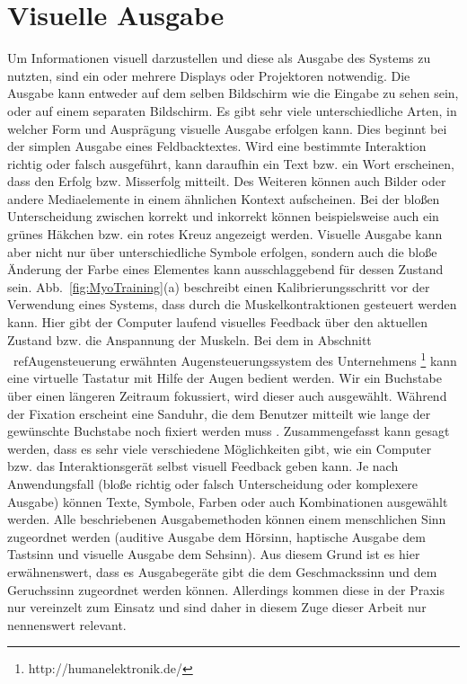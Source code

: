 \section{Visuelle Ausgabe}
Um Informationen visuell darzustellen und diese als Ausgabe des Systems zu nutzten, sind ein oder mehrere Displays oder Projektoren notwendig. Die Ausgabe kann entweder auf dem selben Bildschirm wie die Eingabe zu sehen sein, oder auf einem separaten Bildschirm.
\newline \newline
Es gibt sehr viele unterschiedliche Arten, in welcher Form und Ausprägung visuelle Ausgabe erfolgen kann. Dies beginnt bei der simplen Ausgabe eines Feldbacktextes. Wird eine bestimmte Interaktion richtig oder falsch ausgeführt, kann daraufhin ein Text bzw. ein Wort erscheinen, dass den Erfolg bzw. Misserfolg mitteilt. Des Weiteren können auch Bilder oder andere Mediaelemente in einem ähnlichen Kontext aufscheinen. Bei der bloßen Unterscheidung zwischen korrekt und inkorrekt können beispielsweise auch ein grünes Häkchen bzw. ein rotes Kreuz angezeigt werden. Visuelle Ausgabe kann aber nicht nur über unterschiedliche Symbole erfolgen, sondern auch die bloße Änderung der Farbe eines Elementes kann ausschlaggebend für dessen Zustand sein.
\newline \newline
Abb.~\ref{fig:MyoTraining}(a) beschreibt einen Kalibrierungsschritt vor der Verwendung eines Systems, dass durch die Muskelkontraktionen gesteuert werden kann. Hier gibt der Computer laufend visuelles Feedback über den aktuellen Zustand bzw. die Anspannung der Muskeln.
\newline \newline
Bei dem in Abschnitt ~ref{Augensteuerung} erwähnten Augensteuerungssystem des Unternehmens %
\footnote{http://humanelektronik.de/}
%
kann eine virtuelle Tastatur mit Hilfe der Augen bedient werden. Wir ein Buchstabe über einen längeren Zeitraum fokussiert, wird dieser auch ausgewählt. Während der Fixation erscheint eine Sanduhr, die dem Benutzer mitteilt wie lange der gewünschte Buchstabe noch fixiert werden muss \cite{SEETECH}. 
%
\newline \newline
Zusammengefasst kann gesagt werden, dass es sehr viele verschiedene Möglichkeiten gibt, wie ein Computer bzw. das Interaktionsgerät selbst visuell Feedback geben kann. Je nach Anwendungsfall (bloße richtig oder falsch Unterscheidung oder komplexere Ausgabe) können Texte, Symbole, Farben oder auch Kombinationen ausgewählt werden.
%
%
%
\newline \newline \newline
Alle beschriebenen Ausgabemethoden können einem menschlichen Sinn zugeordnet werden (auditive Ausgabe dem Hörsinn, haptische Ausgabe dem Tastsinn und visuelle Ausgabe dem Sehsinn). Aus diesem Grund ist es hier erwähnenswert, dass es Ausgabegeräte gibt die dem Geschmackssinn und dem Geruchssinn zugeordnet werden können. Allerdings kommen diese in der Praxis nur vereinzelt zum Einsatz und sind daher in diesem Zuge dieser Arbeit nur nennenswert relevant. 


